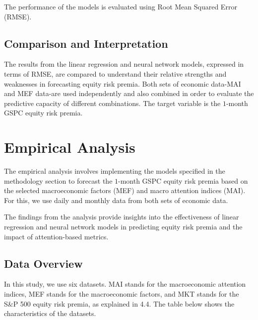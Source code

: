 \documentclass{article}
\begin{document}
The performance of the models is evaluated using Root Mean Squared Error (RMSE).

\subsection{Comparison and Interpretation}

The results from the linear regression and neural network models, expressed in terms of RMSE, are compared to understand their relative strengths and weaknesses in forecasting equity risk premia. Both sets of economic data-MAI and MEF data-are used independently and also combined in order to evaluate the predictive capacity of different combinations. The target variable is the $1$-month GSPC equity risk premia.

\newpage

\section{Empirical Analysis}

The empirical analysis involves implementing the models specified in the methodology section to forecast the $1$-month GSPC equity risk premia based on the selected macroeconomic factors (MEF) and macro attention indices (MAI). For this, we use daily and monthly data from both sets of economic data.

The findings from the analysis provide insights into the effectiveness of linear regression and neural network models in predicting equity risk premia and the impact of attention-based metrics.

\subsection{Data Overview}

In this study, we use six datasets. MAI stands for the macroeconomic attention indices, MEF stands for the macroeconomic factors, and MKT stands for the S\&P 500 equity risk premia, as explained in 4.4. The table below shows the characteristics of the datasets.
\end{document}
